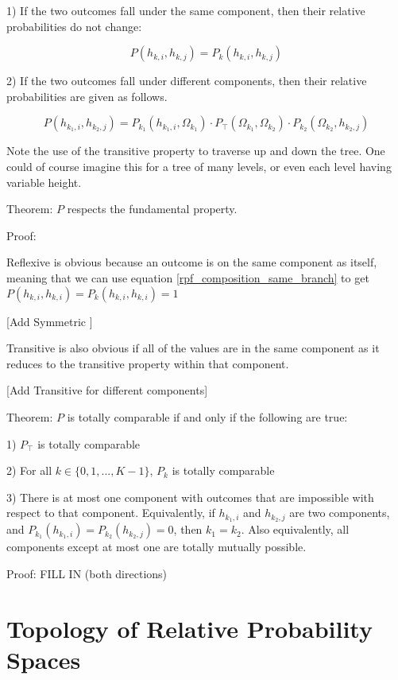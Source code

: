 \documentclass[twoside]{article}
\begin{document}
1) If the two outcomes fall under the same component, then their relative probabilities do not change:

\begin{equation}
\label{rpf_composition_same_branch}
P(h_{k, i}, h_{k, j}) = P_k(h_{k, i}, h_{k, j})
\end{equation}

2) If the two outcomes fall under different components, then their relative probabilities are given as follows.

\begin{equation}
\label{rpf_composition_different_branch}
P(h_{k_1, i}, h_{k_2, j}) = P_{k_1}(h_{k_1, i}, \Omega_{k_1}) \cdot  P_{\top}(\Omega_{k_1}, \Omega_{k_2}) \cdot P_{k_2}(\Omega_{k_2}, h_{k_2, j})
\end{equation}

Note the use of the transitive property to traverse up and down the tree. One could of course imagine this for a tree of many levels, or even each level having variable height.

Theorem: \(P\) respects the fundamental property.

Proof:

Reflexive is obvious because an outcome is on the same component as itself, meaning that we can use equation \ref{rpf_composition_same_branch} to get \(P(h_{k, i}, h_{k, i}) = P_k(h_{k, i}, h_{k, i}) = 1\)

[Add Symmetric ]

Transitive is also obvious if all of the values are in the same component as it reduces to the transitive property within that component.

[Add Transitive for different components]

Theorem: \(P\) is totally comparable if and only if the following are true:

1) \(P_{\top}\) is totally comparable

2) For all \(k \in \{0, 1, ..., K - 1\}\), \(P_k\) is totally comparable

3) There is at most one component with outcomes that are impossible with respect to that component. Equivalently, if \(h_{k_1, i}\) and \(h_{k_2, j}\) are two components, and \(P_{k_1}(h_{k_1, i}) = P_{k_2}(h_{k_2, j}) = 0\), then \(k_1 = k_2\). Also equivalently, all components except at most one are totally mutually possible.

Proof: FILL IN (both directions)

\section{Topology of Relative Probability Spaces}
\end{document}
